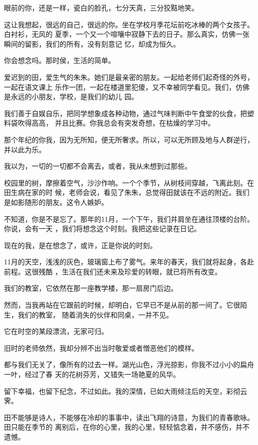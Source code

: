 \documentclass[12pt,a4paper]{article}
\begin{document}
	\endwriting



		眼前的你，还是一样，瓷白的脸孔，七分天真，三分狡黠地笑。

		这让我想起，很远的自己，很远的你。坐在学校月季花坛前吃冰棒的两个女孩子。白衬衫，无风的
	夏季，一个又一个喧嚷中寂静下去的日子。那么真实，仿佛一张瞬间的留影，我们的所有，没有刻意记
	忆，却成为恒久。


		你会想念吗。那时侯，生活的简单。

		爱迟到的田，爱生气的朱朱。她们是最亲密的朋友。一起给老师们起奇怪的外号，一起在语文课上
	乐作一团，一起在楼道里犯傻，又不幸被同学看见。我们，仿佛是永远的小朋友，学校，是我们的幼儿
	园。

		我们善于自娱自乐，把同学想象成各种动物，通过气味判断中午食堂的伙食，把塑料袋吹得高高，
	并且比赛。你我总会有突发奇想，在枯燥的学习中。


		那个年纪的你我，因为无所知，便无所奢求。所以，可以无所顾及地与人群逆行，并以此为乐。

		我以为，一切的一切都不会离去，或者，我从未想到过那些。


		校园里的树，摩擦着空气，沙沙作响。一个个季节，从树枝间穿越，飞离此刻。在田生病在家的时
	候，老师会说，看见了朱朱，总觉得田就该在不远的附近。我们是如影随形的朋友。这令人嫉妒。

		不知道，你是不是忘了。那年的11月，一个下午，我们并肩坐在通往顶楼的台阶。你说，会有一天
	，我们将想念这个时刻。我把这些记录在日记。


		现在的我，是在想念了，或许，正是你说的时刻。

		11月的天空，浅浅的灰色，玻璃窗上布了雾气。来年的春天，我们就将起身，各赴前程。这很残酷
	，生活在我们还未来及珍爱的转眼，就已将所有改变。


		我们的教室，它依然在那一座教学楼，那一扇房门后边。

		然而，当我再站在它跟前的时候，却明白，它早已不是从前的那一间了。它很陌生，我们的教室，
	随着消失的伙伴和同桌，一并不见。

		它在时空的某段漂流，无家可归。

		旧时的老师依然，我却分辨不出当时敬爱或者憎恶他们的模样。


		都与我们无关了，像所有的过去一样。湖光山色，浮光掠影，你我不过小小的扁舟一叶，经过了春
	天的花树芬芳，又错失一场艳夏的风华。


		留下幸福，也留下纪念，不过如此。我的深情，已如大雨倾注后的天空，彩彻云霁。

		田不能够是诗人，不能够在冷却的事事中，读出飞翔的诗意，为我们的青春歌咏。田只能在季节的
	离别后，在你的心里，我的心里，轻轻惦念着，并不感伤，并不遗憾。
\end{document}

